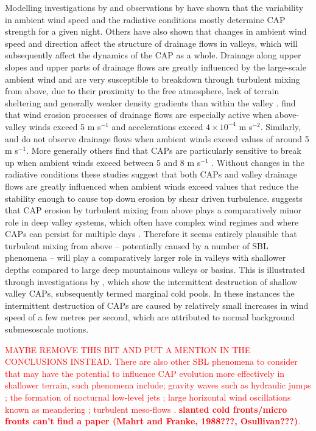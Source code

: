 \documentclass[times]{qjrms4}
\begin{document}
Modelling investigations by \citet{vosper2008numerical} and observations by \citet{sheridan2013characteristics} have shown that the variability in ambient wind speed and the radiative conditions mostly determine CAP strength for a given night. Others have also shown that changes in ambient wind speed \citep{orgill1992mesoscale} and direction \citep{coulter1989} affect the structure of drainage flows in valleys, which will subsequently affect the dynamics of the CAP as a whole. Drainage along upper slopes and upper parts of drainage flows are greatly influenced by the large-scale ambient wind and are very susceptible to breakdown through turbulent mixing from above, due to their proximity to the free atmosphere, lack of terrain sheltering and generally weaker density gradients than within the valley \citep{barr1989influence,gudiksen1992measurements}. \citet{orgill1992mesoscale} find that wind erosion processes of drainage flows are especially active when above-valley winds exceed 5 m s$^{-1}$ and accelerations exceed $4\times10^{-4}$ m s$^{-2}$. Similarly, \citet{heywood1933katabatic} and \citet{gudiksen1992measurements} do not observe drainage flows when ambient winds exceed values of around 5 m s$^{-1}$. More generally others find that CAPs are particularly sensitive to break up when ambient winds exceed between 5 and 8 m s$^{-1}$ \citep{barr1989influence,iijima2000seasonal}. Without changes in the radiative conditions these studies suggest that both CAPs and valley drainage flows are greatly influenced when ambient winds exceed values that reduce the stability enough to cause top down erosion by shear driven turbulence. \citet{zangl2005dynamical} suggests that CAP erosion by turbulent mixing from above plays a comparatively minor role in deep valley systems, which often have complex wind regimes and where CAPs can persist for multiple days \citep{whiteman2001cold}. Therefore it seems entirely plausible that turbulent mixing from above -- potentially caused by a number of SBL phenomena -- will play a comparatively larger role in valleys with shallower depths compared to large deep mountainous valleys or basins. This is illustrated through investigations by \citet{mahrt2015common}, which show the intermittent destruction of shallow valley CAPs, subsequently termed marginal cold pools. In these instances the intermittent destruction of CAPs are caused by relatively small increases in wind speed of a few metres per second, which are attributed to normal background submesoscale motions.

\textcolor{red}{ MAYBE REMOVE THIS BIT AND PUT A MENTION IN THE CONCLUSIONS INSTEAD. There are also other SBL phenomena to consider that may have the potential to influence CAP evolution more effectively in shallower terrain, such phenomena include; gravity waves such as hydraulic jumps \citep{adler2012warm}; the formation of nocturnal low-level jets \citep[NLLJs]{thorpe1977nocturnal}; large horizontal wind oscillations known as meandering \citep{orgill1992mesoscale}; turbulent meso-flows \citep{parker1993case}. \textcolor{red}{\bf slanted cold fronts/micro fronts can't find a paper (Mahrt and Franke, 1988???, Osullivan???)}.}
\end{document}
